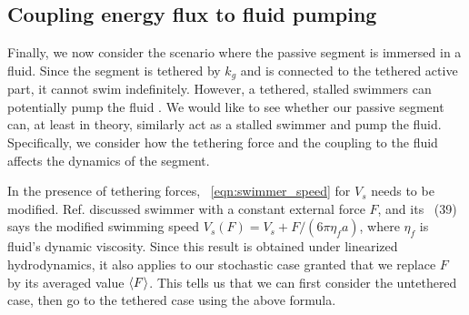 \documentclass[
 preprint,
 preprintnumbers,
 amsmath,amssymb,
 aps,
 pre,
 longbibliography,
 superscriptaddress,
 10pt, twocolumn
]{revtex4-1}
\begin{document}
\subsection{Coupling energy flux to fluid pumping}
Finally, we now consider the scenario where the passive segment is immersed in a fluid. Since the segment is tethered by $k_g$ and is connected to the tethered active part, it cannot swim indefinitely. However, a tethered, stalled swimmers can potentially pump the fluid \cite{Leoni2009BasicSwimmer}.
We would like to see whether our passive segment can, at least in theory, similarly act as a stalled swimmer and pump the fluid.
Specifically, we consider how the tethering force and the coupling to the fluid affects the dynamics of the segment.

In the presence of tethering forces, \eqnname~\eqref{eqn:swimmer_speed} for $V_s$ needs to be modified.
Ref. \cite{Golestanian2008AnalyticResults} discussed swimmer with a constant external force $F$, and its \eqnname~(39) says the modified swimming speed $V_s(F) = V_s + F/(6\pi\eta_f a)$, where $\eta_f$ is fluid's dynamic viscosity.
Since this result is obtained under linearized hydrodynamics, it also applies to our stochastic case granted that we replace $F$ by its averaged value $\expval{F}$.
This tells us that we can first consider the untethered case, then go to the tethered case using the above formula.
\end{document}
